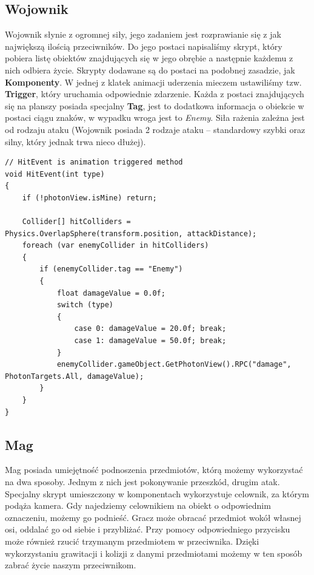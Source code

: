 \documentclass[openright]{xmgr}
\newcommand{\name}[1]{\textbf{\textcolor{NavyBlue}{#1}}}
\begin{document}
    \subsection{Wojownik}

    Wojownik słynie z ogromnej siły, jego zadaniem jest rozprawianie się z jak największą ilością przeciwników. Do jego postaci napisaliśmy skrypt, który pobiera listę obiektów znajdujących się w jego obrębie a następnie każdemu z nich odbiera życie. Skrypty dodawane są do postaci na podobnej zasadzie, jak \name{Komponenty}. W jednej z klatek animacji uderzenia mieczem ustawiliśmy tzw. \name{Trigger}, który uruchamia odpowiednie zdarzenie. Każda z postaci znajdujących się na planszy posiada specjalny \name{Tag}, jest to dodatkowa informacja o obiekcie w postaci ciągu znaków, w wypadku wroga jest to \textit{Enemy}. Siła rażenia zależna jest od rodzaju ataku (Wojownik posiada 2 rodzaje ataku -- standardowy szybki oraz silny, który jednak trwa nieco dłużej).

\begin{minipage}{\textwidth}
\begin{lstlisting}[caption={Algorytm zadawania obrażeń wrogom}]
// HitEvent is animation triggered method
void HitEvent(int type)
{
    if (!photonView.isMine) return;

    Collider[] hitColliders = Physics.OverlapSphere(transform.position, attackDistance);
    foreach (var enemyCollider in hitColliders)
    {
        if (enemyCollider.tag == "Enemy")
        {
            float damageValue = 0.0f;
            switch (type)
            {
                case 0: damageValue = 20.0f; break;
                case 1: damageValue = 50.0f; break;
            }
            enemyCollider.gameObject.GetPhotonView().RPC("damage", PhotonTargets.All, damageValue);
        }
    }
}
\end{lstlisting}
\end{minipage}


    \subsection{Mag}

    Mag posiada umiejętność podnoszenia przedmiotów, którą możemy wykorzystać na dwa sposoby. Jednym z nich jest pokonywanie przeszkód, drugim atak. Specjalny skrypt umieszczony w komponentach wykorzystuje celownik, za którym podąża kamera. Gdy najedziemy celownikiem na obiekt o odpowiednim oznaczeniu, możemy go podnieść. Gracz może obracać przedmiot wokół własnej osi, oddalać go od siebie i przybliżać. Przy pomocy odpowiedniego przycisku może również rzucić trzymanym przedmiotem w przeciwnika. Dzięki wykorzystaniu grawitacji i kolizji z danymi przedmiotami możemy w ten sposób zabrać życie naszym przeciwnikom.
\end{document}
